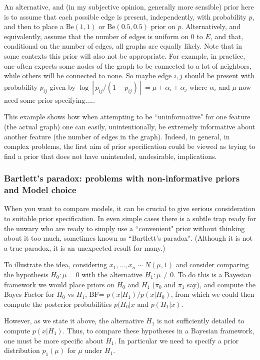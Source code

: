 \documentclass[12pt]{article}
\begin{document}
An alternative, and (in my subjective opinion, generally more sensible) prior here is to assume that each possible edge is present, independently, with probability $p$, and then to place a Be$(1,1)$ or Be$(0.5,0.5)$ prior on $p$.  Alternatively, and equivalently,
assume that the number of edges is uniform on $0$ to $E$, and that, conditional on the number of edges, all graphs are equally likely. Note that in some contexts this prior will also not be appropriate. For example, in practice, one often expects some nodes of the graph to be connected to a lot of neighbors, while others will be connected to none. So maybe edge $i,j$ should be present with probability $p_{ij}$ given by $\log[p_{ij}/(1-p_{ij})] = \mu+\alpha_i + \alpha_j$ where
$\alpha_i$ and $\mu$ now need some prior specifying.....

This example shows how when attempting to be ``uninformative" for one feature (the actual graph)
one can easily, unintentionally, be extremely informative about another feature (the number of edges in the graph). Indeed, in general, in complex problems, the first aim of prior specification could be viewed as trying to find a prior that does not have unintended, undesirable, implications.

\subsubsection{Bartlett's paradox: problems with non-informative priors and Model choice}

When you want to compare models, it can
be crucial to give serious consideration to
suitable prior specification.  In even simple cases there is a subtle trap ready for the unwary who
are ready to simply use a ``convenient" prior without
thinking about it too much, sometimes known as ``Bartlett's paradox". (Although it is not a true paradox, it is an
unexpected result for many.)

To illustrate the idea, considering
$x_1,\dots,x_n \sim N(\mu,1)$ and consider comparing the hypothesis $H_0: \mu=0$ with the alternative $H_1: \mu \neq 0$. 
To do this is a Bayesian framework we would
place priors on $H_0$ and $H_1$ ($\pi_0$ and $\pi_1$ say), and compute the Bayes Factor for $H_0$ vs $H_1$,
BF= $p(x | H_1)/p(x|H_0)$, from which we could
then compute the posterior probabilities $p(H_0|x$ and $p(H_1 | x)$. 

However, as we state it above, the alternative $H_1$ is not sufficiently  detailed to compute $p(x | H_1)$. Thus, to compare these hypotheses in a Bayesian framework, one must be more specific
about $H_1$. In particular we need to specify a prior distribution $p_1(\mu)$ for $\mu$ under $H_1$.
\end{document}
